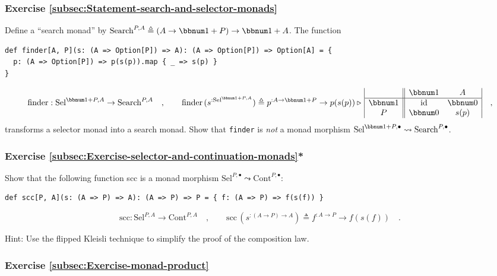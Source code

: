 \subsubsection{Exercise \label{subsec:Statement-search-and-selector-monads}\ref{subsec:Statement-search-and-selector-monads}}

Define a \textsf{``}search monad\textsf{''} by $\text{Search}^{P,A}\triangleq\left(A\rightarrow\bbnum 1+P\right)\rightarrow\bbnum 1+A$.
The function 
\begin{lstlisting}
def finder[A, P](s: (A => Option[P]) => A): (A => Option[P]) => Option[A] = {
  p: (A => Option[P]) => p(s(p)).map { _ => s(p) }
}
\end{lstlisting}
\[
\text{finder}:\text{Sel}^{\bbnum 1+P,A}\rightarrow\text{Search}^{P,A}\quad,\quad\quad\text{finder}\,(s^{:\text{Sel}^{\bbnum 1+P,A}})\triangleq p^{:A\rightarrow\bbnum 1+P}\rightarrow p(s(p))\triangleright\,\begin{array}{|c||cc|}
 & \bbnum 1 & A\\
\hline \bbnum 1 & \text{id} & \bbnum 0\\
P & \bbnum 0 & s(p)
\end{array}\quad,
\]
transforms a selector monad into a search monad. Show that \lstinline!finder!
is \emph{not} a monad morphism $\text{Sel}^{\bbnum 1+P,\bullet}\leadsto\text{Search}^{P,\bullet}$.

\subsubsection{Exercise \label{subsec:Exercise-selector-and-continuation-monads}\ref{subsec:Exercise-selector-and-continuation-monads}{*}}

Show that the following function scc is a monad morphism $\text{Sel}^{P,\bullet}\leadsto\text{Cont}^{P,\bullet}$:
\begin{lstlisting}
def scc[P, A](s: (A => P) => A): (A => P) => P = { f: (A => P) => f(s(f)) }
\end{lstlisting}
\[
\text{scc}:\text{Sel}^{P,A}\rightarrow\text{Cont}^{P,A}\quad,\quad\quad\text{scc}\,(s^{:(A\rightarrow P)\rightarrow A})\triangleq f^{:A\rightarrow P}\rightarrow f(s(f))\quad.
\]

Hint: Use the flipped Kleisli technique to simplify the proof of the
composition law.

\subsubsection{Exercise \label{subsec:Exercise-monad-product}\ref{subsec:Exercise-monad-product}}

